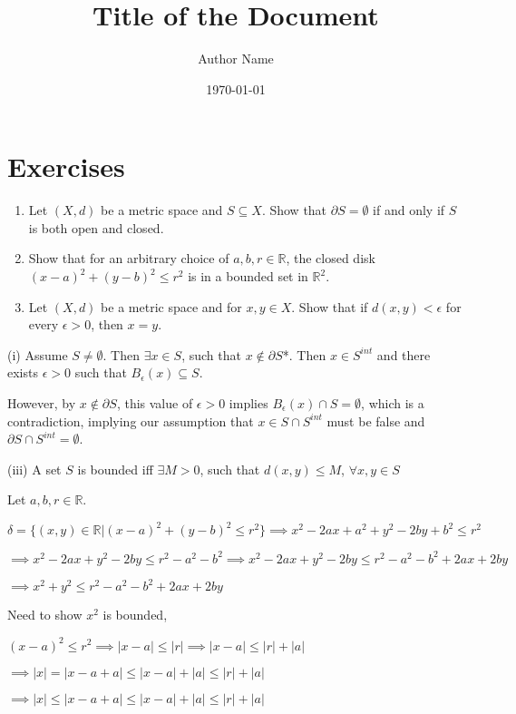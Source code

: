 \documentclass{article}
\title{\textbf{Title of the Document}}
\author{Author Name}
\date{\today}
\theoremstyle{definition}
\numberwithin{equation}{section}
\begin{document}
\maketitle
\tableofcontents
\newpage
\section{Exercises}

\begin{enumerate}
    \item Let $(X, d)$ be a metric space and $S \subseteq X$. Show that $\partial S = \emptyset$ if and only if $S$ is both open and closed.
    \item Show that for an arbitrary choice of $a, b, r \in \mathbb{R}$, the closed disk $(x-a)^2 + (y - b)^2 \leq r^2$ is in a bounded set in $\mathbb{R}^2$.
    \item Let $(X, d)$ be a metric space and for $x, y \in X$. Show that if $d(x, y) < \epsilon$ for every $\epsilon > 0$, then $x = y$.
\end{enumerate}

\noindent (i) Assume $S \not= \emptyset$. Then $\exists x \in S$, such that $x \notin \partial S$*. Then $x \in S^{int}$ and there exists $\epsilon > 0$ such that $B_{\epsilon}(x) \subseteq S$. 

However, by $x \notin \partial S$, this value of $\epsilon > 0$ implies $B_{\epsilon}(x) \cap S = \emptyset$, which is a contradiction, implying our assumption that $x \in S \cap S^{int}$ must be false and $\partial S \cap S^{int} = \emptyset$. 

\noindent (iii) A set $S$ is bounded iff $\exists M > 0$, such that $d(x, y) \leq M$, $\forall x, y \in S$

Let $a, b, r \in \mathbb{R}$. 

$\delta = \{(x, y) \in \mathbb{R} | (x-a)^2 + (y-b)^2 \leq r^2 \} \implies x^2 - 2ax + a^2 + y^2 -2by + b^2 \leq r^2$

$\implies x^2 - 2ax + y^2 - 2by \leq r^2 - a^2 - b^2 \implies x^2 - 2ax + y^2 - 2by \leq r^2 - a^2 - b^2 + 2ax + 2by$

$\implies x^2 + y^2 \leq r^2 - a^2 - b^2 + 2ax + 2by$

Need to show $x^2$ is bounded,

$(x-a)^2 \leq r^2 \implies |x-a| \leq |r| \implies |x-a| \leq |r| + |a|$

$\implies |x| = |x-a+a| \leq |x-a|+|a| \leq |r| + |a|$

$\implies |x| \leq |x-a+a| \leq |x-a|+|a| \leq |r| + |a|$
\end{document}
